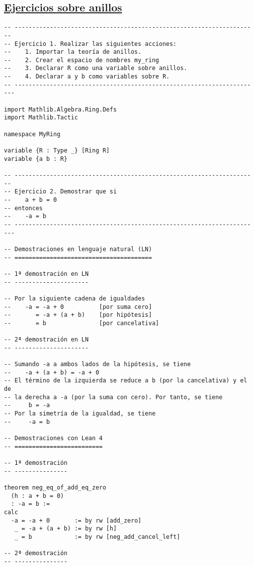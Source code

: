 \subsection{\href{./src/Basicos/Ejercicios\_sobre\_anillos.lean}{Ejercicios sobre anillos}}
\label{sec:orgbdaab39}
\begin{verbatim}
-- ---------------------------------------------------------------------
-- Ejercicio 1. Realizar las siguientes acciones:
--    1. Importar la teoría de anillos.
--    2. Crear el espacio de nombres my_ring
--    3. Declarar R como una variable sobre anillos.
--    4. Declarar a y b como variables sobre R.
-- ----------------------------------------------------------------------

import Mathlib.Algebra.Ring.Defs
import Mathlib.Tactic

namespace MyRing

variable {R : Type _} [Ring R]
variable {a b : R}

-- ---------------------------------------------------------------------
-- Ejercicio 2. Demostrar que si
--    a + b = 0
-- entonces
--    -a = b
-- ----------------------------------------------------------------------

-- Demostraciones en lenguaje natural (LN)
-- =======================================

-- 1ª demostración en LN
-- ---------------------

-- Por la siguiente cadena de igualdades
--    -a = -a + 0          [por suma cero]
--       = -a + (a + b)    [por hipótesis]
--       = b               [por cancelativa]

-- 2ª demostración en LN
-- ---------------------

-- Sumando -a a ambos lados de la hipótesis, se tiene
--    -a + (a + b) = -a + 0
-- El término de la izquierda se reduce a b (por la cancelativa) y el de
-- la derecha a -a (por la suma con cero). Por tanto, se tiene
--     b = -a
-- Por la simetría de la igualdad, se tiene
--     -a = b

-- Demostraciones con Lean 4
-- =========================

-- 1ª demostración
-- ---------------

theorem neg_eq_of_add_eq_zero
  (h : a + b = 0)
  : -a = b :=
calc
  -a = -a + 0       := by rw [add_zero]
   _ = -a + (a + b) := by rw [h]
   _ = b            := by rw [neg_add_cancel_left]

-- 2ª demostración
-- ---------------


\end{verbatim}
